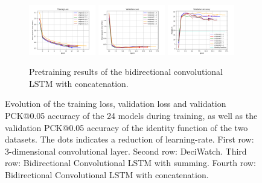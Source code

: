 \documentclass[./main.tex]{subfiles}
\begin{document}
\begin{figure}[htbp]
    \begin{subfigure}[b]{\textwidth}
        \centering
        \includegraphics[width=0.32\textwidth]{./entities/finetuned/unipose2/train_losses.png}
        \includegraphics[width=0.32\textwidth]{./entities/finetuned/unipose2/val_losses.png}
        \includegraphics[width=0.32\textwidth]{./entities/finetuned/unipose2/val_accs.png}
        \caption{Pretraining results of the bidirectional convolutional LSTM with concatenation.}
    \end{subfigure}
    \hfill
    
    \caption{Evolution of the training loss, validation loss and validation PCK@0.05 accuracy of the 24 models during training, as well as the validation PCK@0.05 accuracy of the identity function of the two datasets. The dots indicates a reduction of learning-rate. First row: 3-dimensional convolutional layer. Second row: DeciWatch. Third row: Bidirectional Convolutional LSTM with summing. Fourth row: Bidirectional Convolutional LSTM with concatenation.}
    \label{fig:finetune_res}
\end{figure}
\end{document}
